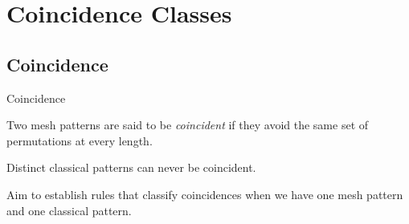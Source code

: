 \section{Coincidence Classes}
\label{sec:Coincidence Classes}
\subsection{Coincidence}
\label{sub:Coincidence}
\begin{frame}{Coincidence}
  \begin{definition}
    Two mesh patterns are said to be \emph{coincident} if they avoid the
    same set of permutations at every length.
  \end{definition}
  \begin{block}{}
    Distinct classical patterns can never be coincident.

    Aim to establish rules that classify coincidences when we
    have one mesh pattern and one classical pattern.
  \end{block}
\end{frame}

